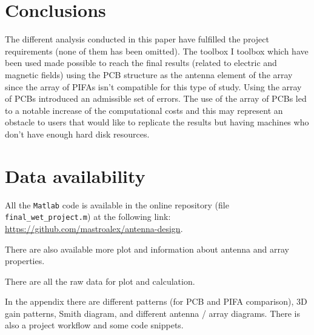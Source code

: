 \documentclass[10 pt,a4paper,twocolumn]{article}
\begin{document}
{\section*{Conclusions}
The different analysis conducted in this paper have fulfilled the project requirements (none of them has been omitted). 
The toolbox
I toolbox which have been used made possible to reach the final results (related to electric and magnetic fields) using the PCB structure as the antenna element of the array since the array of PIFAs isn't compatible for this type of study. Using the array of PCBs introduced an admissible set of errors. The use of the array of PCBs led to a notable increase of the computational costs  and this may represent an obstacle to users that would like to replicate the results but having machines who don't have enough hard disk resources. 


\section*{Data availability}

All the \texttt{Matlab} code is available in the online repository (file 	\colorbox{backcolour}{\texttt{final\_wet\_project.m}}) at the following link: \url{https://github.com/mastroalex/antenna-design}.

There are also available more plot and information about antenna and array properties. 

There are all the raw data for plot and calculation.

In the appendix there are different patterns (for PCB and PIFA comparison), 3D gain patterns, Smith diagram, and different antenna / array diagrams. There is also a project workflow and some code snippets. 

		\printbibliography

\pagebreak
\appendix

	

}
\end{document}
